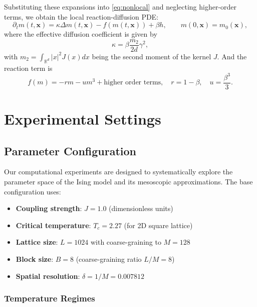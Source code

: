 \documentclass[11pt,a4paper]{article}
\begin{document}
Substituting these expansions into \cref{eq:nonlocal} and neglecting higher-order terms, we obtain the local reaction-diffusion PDE:
\begin{equation}\label{eq:local}
    \partial_t m(t,\mathbf{x}) = \kappa \Delta m(t,\mathbf{x}) - f(m(t,\mathbf{x})) + \beta h,
    \qquad m(0,\mathbf{x})=m_0(\mathbf{x}),
\end{equation}
where the effective diffusion coefficient is given by
\begin{equation}
    \kappa = \beta \frac{m_2}{2d} \gamma^2,
\end{equation}
with $m_2 = \int_{\mathbb{R}^d} |x|^2 J(x) dx$ being the second moment of the kernel $J$. And the reaction term is
\begin{equation}
    f(m) = -rm - u m^3 + \text{higher order terms}, \quad r = 1-\beta, \quad u = \frac{\beta^3}{3}.
\end{equation} 


\section{Experimental Settings}

\subsection{Parameter Configuration}

Our computational experiments are designed to systematically explore the parameter space of the Ising model and its mesoscopic approximations. The base configuration uses:

\begin{itemize}
    \item \textbf{Coupling strength}: $J = 1.0$ (dimensionless units)
    \item \textbf{Critical temperature}: $T_c = 2.27$ (for 2D square lattice)
    \item \textbf{Lattice size}: $L = 1024$ with coarse-graining to $M = 128$
    \item \textbf{Block size}: $B = 8$ (coarse-graining ratio $L/M = 8$)
    \item \textbf{Spatial resolution}: $\delta = 1/M = 0.007812$
\end{itemize}

\subsubsection{Temperature Regimes}
\end{document}
